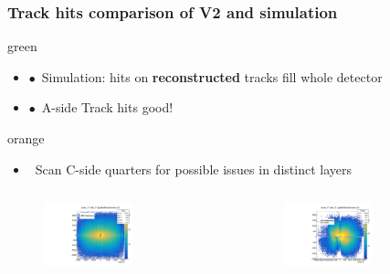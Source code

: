 \documentclass[aspectratio=1610, 12pt, xcolor=dvipsnames]{beamer}
\begin{document}
\begin{frame}\frametitle{Track hits comparison of V2 and simulation}
\begin{mybox}{green}{}
  \begin{itemize}
    \item $\bullet$\, Simulation: hits on \textbf{reconstructed} tracks fill whole detector
    \item $\bullet$\, A-side Track hits good!
  \end{itemize}
\end{mybox}
\begin{mybox}{orange}{}
  \begin{itemize}
    \item \to\, Scan C-side quarters for possible issues in distinct layers
  \end{itemize}
\end{mybox}
  \begin{columns}
    \begin{column}[c]{0.48\textwidth}
      \begin{figure}
        \centering
        \includegraphics[width=0.6\textwidth]{logos/nodeXY_MC.pdf}%
      \end{figure}
    \end{column}
    \begin{column}[c]{0.48\textwidth}
      \begin{figure}
        \centering
        \includegraphics[width=0.6\textwidth]{tuples_out/combining_2D_nodeXY_v2.pdf}%
      \end{figure}
    \end{column}
  \end{columns}
\end{frame}
\end{document}
